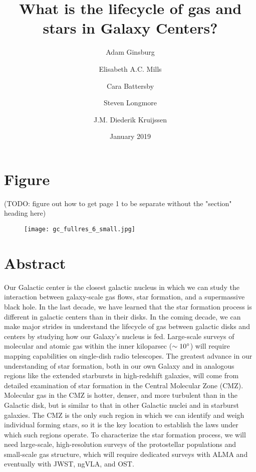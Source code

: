 \documentclass[modern]{aastex62}
\begin{document}
\author{Adam Ginsburg}
\author{Elisabeth A.C. Mills}
\author{Cara Battersby}
\author{Steven Longmore}
\author{J.M. Diederik Kruijssen}

\title{What is the lifecycle of gas and stars in Galaxy Centers?}
\date{January 2019}

\section{Figure}
(TODO: figure out how to get page 1 to be separate without the "section" heading here)

\begin{figure}[htp]
    \texttt{[image: gc\_fullres\_6\_small.jpg]}
\end{figure}

\clearpage
\newpage



\section{Abstract}
Our Galactic center is the closest galactic nucleus in which we can study the
interaction between galaxy-scale gas flows, star formation, and a supermassive
black hole.  In the last decade, we have learned that the star formation
process is different in galactic centers than in their disks.  In
the coming decade, we can make major strides in understand the lifecycle
of gas between galactic disks and centers by studying how our Galaxy's
nucleus is fed.  Large-scale surveys of molecular and atomic gas within
the inner kiloparsec ($\sim10^{\circ}$) will require mapping capabilities
on single-dish radio telescopes.
The greatest advance in our understanding of star formation, both in our
own Galaxy and in analogous regions like the extended starbursts in high-redshift galaxies,
will come from detailed examination of star formation in the Central Molecular Zone (CMZ).
Molecular gas in the CMZ is hotter, denser, and more turbulent than in the Galactic disk,
but is similar to that in other Galactic nuclei and in starburst galaxies.
The CMZ is the only such region in which we can identify and weigh individual
forming stars, so it is the key location to establish the laws under which such
regions operate.  To characterize the star formation process, we will need large-scale,
high-resolution surveys of the protostellar populations and small-scale gas structure,
which will require dedicated surveys with ALMA and eventually with JWST, ngVLA, and OST.
\end{document}

